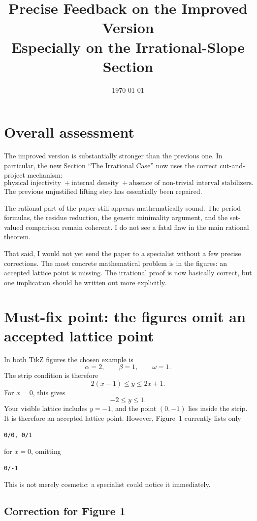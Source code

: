 \documentclass[11pt]{article}
\title{Precise Feedback on the Improved Version\\
\large Especially on the Irrational-Slope Section}
\author{}
\date{\today}
\begin{document}
\maketitle

\section*{Overall assessment}

The improved version is substantially stronger than the previous one.  In
particular, the new Section ``The Irrational Case'' now uses the correct
cut-and-project mechanism:
\[
    \text{physical injectivity}
    \;+
    \text{internal density}
    \;+
    \text{absence of non-trivial interval stabilizers}.
\]
The previous unjustified lifting step has essentially been repaired.

The rational part of the paper still appears mathematically sound.  The
period formulas, the residue reduction, the generic minimality argument, and
the set-valued comparison remain coherent.  I do not see a fatal flaw in the
main rational theorem.

That said, I would not yet send the paper to a specialist without a few
precise corrections.  The most concrete mathematical problem is in the
figures: an accepted lattice point is missing.  The irrational proof is now
basically correct, but one implication should be written out more explicitly.

\section{Must-fix point: the figures omit an accepted lattice point}

In both TikZ figures the chosen example is
\[
    \alpha=2,\qquad \beta=1,\qquad \omega=1.
\]
The strip condition is therefore
\[
    2(x-1) \le y \le 2x+1.
\]
For \(x=0\), this gives
\[
    -2 \le y \le 1.
\]
Your visible lattice includes \(y=-1\), and the point \((0,-1)\) lies inside
the strip.  It is therefore an accepted lattice point.  However, Figure~1
currently lists only
\begin{lstlisting}
0/0, 0/1
\end{lstlisting}
for \(x=0\), omitting
\begin{lstlisting}
0/-1
\end{lstlisting}

This is not merely cosmetic: a specialist could notice it immediately.

\subsection*{Correction for Figure 1}
\end{document}
